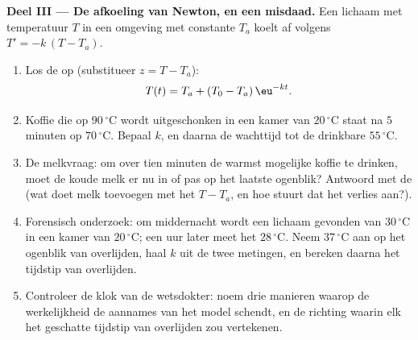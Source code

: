 \begin{problem}
\medskip
\noindent\textbf{Deel III --- De afkoeling van Newton, en een misdaad.}
Een lichaam met temperatuur $T$ in een omgeving met constante $T_a$ koelt af
volgens $T' = -k\,(T - T_a)$.
\begin{enumerate}[resume]
  \item Los de  op (substitueer $z = T - T_a$):
        \[
        T(t) = T_a + (T_0 - T_a)\,\eu^{-kt} .
        \]
  \item Koffie die op $90\,^\circ$C wordt uitgeschonken in een kamer van
        $20\,^\circ$C staat na $5$ minuten op $70\,^\circ$C. Bepaal $k$, en
        daarna de wachttijd tot de drinkbare $55\,^\circ$C.
  \item De melkvraag: om over tien minuten de warmst mogelijke koffie te
        drinken, moet de koude melk er nu in of pas op het laatste ogenblik?
        Antwoord met de  (wat doet melk toevoegen met het 
        $T - T_a$, en hoe stuurt dat  het verlies aan?).
  \item Forensisch onderzoek: om middernacht wordt een lichaam gevonden van
        $30\,^\circ$C in een kamer van $20\,^\circ$C; een uur later meet het
        $28\,^\circ$C. Neem $37\,^\circ$C aan op het ogenblik van overlijden,
        haal $k$ uit de twee metingen, en bereken daarna het tijdstip van
        overlijden.
  \item Controleer de klok van de wetsdokter: noem drie manieren waarop de
        werkelijkheid de aannames van het model schendt, en de richting
        waarin elk het geschatte tijdstip van overlijden zou vertekenen.
\end{enumerate}


\end{problem}
